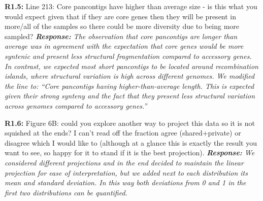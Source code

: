 \documentclass[aps,rmp,onecolumn]{revtex4-1}
\newcommand{\Marco}[1]{{\color{gray}Marco: #1}}
\newcommand{\Liam}[1]{{\color{teal}Liam: #1}}
\newcommand{\reviewer}[2]{\textbf{#1:} #2\vskip 5mm}
\newcommand{\response}[1]{{\it {\color{response}\textbf{Response:} #1}}\vskip 5mm}
\begin{document}
\reviewer{R1.5}{Line 213: Core pancontigs have higher than average size - is this what you would expect given that if they are core genes then they will be present in more/all of the samples so there could be more diversity due to being more sampled?}
\response{The observation that core pancontigs are longer than average was in agreement with the expectation that core genes would be more syntenic and present less structural fragmentation compared to accessory genes. In contrast, we expected most short pancontigs to be located around recombination islands, where structural variation is high across different genomes.
      We modified the line to: ``Core pancontigs having higher-than-average length. This is expected given their strong synteny and the fact that they present less structural variation across genomes compared to accessory genes.''}

\reviewer{R1.6}{Figure 6B: could you explore another way to project this data so it is not squished at the ends? I can't read off the fraction agree (shared+private) or disagree which I would like to (although at a glance this is exactly the result you want to see, so happy for it to stand if it is the best projection).}
\response{We considered different projections and in the end decided to maintain the linear projection for ease of interpretation, but we added next to each distribution its mean and standard deviation. In this way both deviations from 0 and 1 in the first two distributions can be quantified.}
\end{document}
